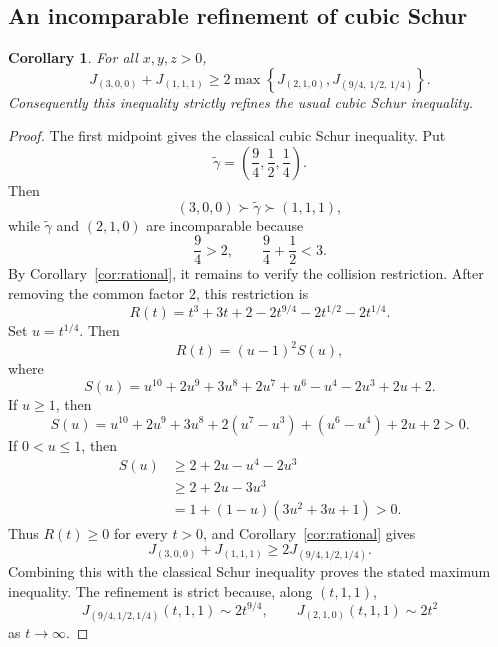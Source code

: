 \documentclass[11pt]{article}
\newtheorem{corollary}[theorem]{Corollary}
\theoremstyle{definition}
\begin{document}
\subsection{An incomparable refinement of cubic Schur}

\begin{corollary}\label{cor:sun-schur}
For all \(x,y,z>0\),
\begin{equation*}
J_{(3,0,0)}+J_{(1,1,1)}
\ge
2\max\left\{
J_{(2,1,0)},
J_{(9/4,\,1/2,\,1/4)}
\right\}.
\end{equation*}
Consequently this inequality strictly refines the usual cubic Schur inequality.
\end{corollary}

\begin{proof}
The first midpoint gives the classical cubic Schur inequality.  Put
\begin{equation*}
\widetilde\gamma
=\left(\frac94,\frac12,\frac14\right).
\end{equation*}
Then
\begin{equation*}
(3,0,0)\succ\widetilde\gamma\succ(1,1,1),
\end{equation*}
while \(\widetilde\gamma\) and \((2,1,0)\) are incomparable because
\begin{equation*}
\frac94>2,
\qquad
\frac94+\frac12<3.
\end{equation*}
By Corollary~\ref{cor:rational}, it remains to verify the collision restriction.  After removing the common factor \(2\), this restriction is
\begin{equation*}
R(t)
=t^3+3t+2-2t^{9/4}-2t^{1/2}-2t^{1/4}.
\end{equation*}
Set \(u=t^{1/4}\).  Then
\begin{equation*}
R(t)=(u-1)^2S(u),
\end{equation*}
where
\begin{equation*}
S(u)
=u^{10}+2u^9+3u^8+2u^7+u^6-u^4-2u^3+2u+2.
\end{equation*}
If \(u\ge1\), then
\begin{equation*}
S(u)
=u^{10}+2u^9+3u^8+2(u^7-u^3)+(u^6-u^4)+2u+2>0.
\end{equation*}
If \(0<u\le1\), then
\begin{align*}
S(u)
&\ge2+2u-u^4-2u^3\\
&\ge2+2u-3u^3\\
&=1+(1-u)(3u^2+3u+1)>0.
\end{align*}
Thus \(R(t)\ge0\) for every \(t>0\), and Corollary~\ref{cor:rational} gives
\begin{equation*}
J_{(3,0,0)}+J_{(1,1,1)}
\ge2J_{(9/4,1/2,1/4)}.
\end{equation*}
Combining this with the classical Schur inequality proves the stated maximum inequality.  The refinement is strict because, along \((t,1,1)\),
\begin{equation*}
J_{(9/4,1/2,1/4)}(t,1,1)\sim2t^{9/4},
\qquad
J_{(2,1,0)}(t,1,1)\sim2t^2
\end{equation*}
as \(t\to\infty\).
\end{proof}
\end{document}
